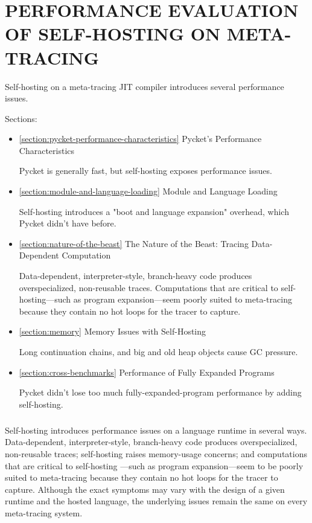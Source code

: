 \chapter[\texorpdfstring{PERFORMANCE EVALUATION OF SELF-HOSTING ON META-TRACING}
                          {6. Performance Evaluation}]{PERFORMANCE EVALUATION OF SELF-HOSTING ON META-TRACING}

	\label{chapter:problem}

	\begin{chaptersynopsis}
		\footnotesize
		Self-hosting on a meta-tracing JIT compiler introduces several performance issues.

		Sections:
		\begin{itemize}
			\item \ref{section:pycket-performance-characteristics} Pycket's Performance Characteristics

				Pycket is generally fast, but self-hosting exposes performance issues.
			\item \ref{section:module-and-language-loading} Module and Language Loading

				Self-hosting introduces a "boot and language expansion" overhead, which Pycket didn't have before.
			\item \ref{section:nature-of-the-beast} The Nature of the Beast: Tracing Data-Dependent Computation

				Data-dependent, interpreter-style, branch-heavy code produces overspecialized, non-reusable traces. Computations that are critical to self-hosting—such as program expansion—seem poorly suited to meta-tracing because they contain no hot loops for the tracer to capture.
			\item \ref{section:memory} Memory Issues with Self-Hosting

				Long continuation chains, and big and old heap objects cause GC pressure.
			\item \ref{section:cross-benchmarks} Performance of Fully Expanded Programs

				Pycket didn't lose too much fully-expanded-program performance by adding self-hosting.
		\end{itemize}
	\end{chaptersynopsis}

	\paragraph{}%
	 	Self-hosting introduces performance issues on a language runtime in several ways. Data-dependent, interpreter-style, branch-heavy code produces overspecialized, non-reusable traces; self-hosting raises memory-usage concerns; and computations that are critical to self-hosting —such as program expansion—seem to be poorly suited to meta-tracing because they contain no hot loops for the tracer to capture. Although the exact symptoms may vary with the design of a given runtime and the hosted language, the underlying issues remain the same on every meta-tracing system.

